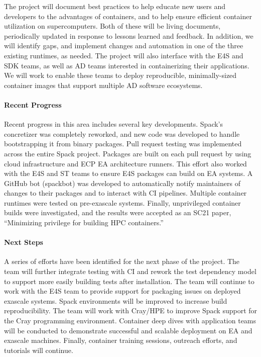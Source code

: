 The project will document best practices 
to help educate new users and developers to the advantages of containers,
and to help ensure efficient container
utilization on supercomputers. Both of these will be living
documents, periodically updated in response to lessons learned and
feedback.  In addition, we will identify gaps, and implement changes and
automation in one of the three existing runtimes, as needed.  The project
will also interface with the E4S and SDK teams, as well as AD teams
interested in containerizing their applications. We will work to enable
these teams to deploy reproducible, minimally-sized container images that
support multiple AD software ecosystems.

\paragraph{Recent Progress} Recent progress in this area includes several key developments.
%
Spack's concretizer was completely reworked, and new code was developed to handle bootstrapping it from binary packages.
%
Pull request testing was implemented across the entire Spack project. Packages
are built on each pull request by using cloud infrastructure and ECP EA architecture runners.
%
This effort also worked with the E4S and ST teams to ensure E4S packages can build on EA systems.
%
A GitHub bot (spackbot) was developed to automatically notify maintainers of changes to their packages and to interact with CI pipelines.
%
Multiple container runtimes were tested on pre-exascale systems.
%
Finally, unprivileged container builds were investigated, and the results were accepted as an SC21 paper, ``Minimizing privilege for building HPC containers.''


\paragraph{Next Steps} A series of efforts have been identified for the next phase of the project.
%
The team will further integrate testing with CI and rework the test dependency model to
support more easily building tests after installation.
%
The team will continue to work with the E4S team to provide support for packaging issues on deployed exascale systems.
%
Spack environments will be improved to increase build reproducibility.
%
The team will work with Cray/HPE to improve Spack support for the Cray programming environment.
%
Container deep dives with application teams will be conducted to demonstrate successful
and scalable deployment on EA and exascale machines.
%
Finally, container training sessions, outreach efforts, and tutorials will continue.
